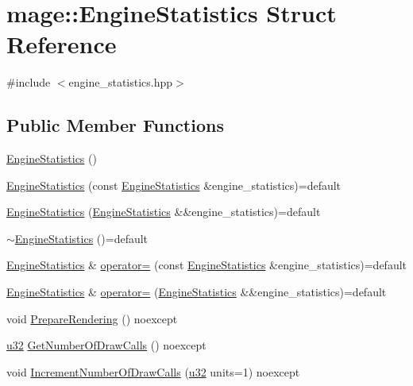 \hypertarget{structmage_1_1_engine_statistics}{}\section{mage\+:\+:Engine\+Statistics Struct Reference}
\label{structmage_1_1_engine_statistics}


{\ttfamily \#include $<$engine\+\_\+statistics.\+hpp$>$}

\subsection*{Public Member Functions}
\begin{DoxyCompactItemize}
\item 
\hyperlink{structmage_1_1_engine_statistics_acbaa39e0e0ee0d6cb5c8d174bb80a3fd}{Engine\+Statistics} ()
\item 
\hyperlink{structmage_1_1_engine_statistics_a8361fa991298c7669b4e3c8262acff60}{Engine\+Statistics} (const \hyperlink{structmage_1_1_engine_statistics}{Engine\+Statistics} \&engine\+\_\+statistics)=default
\item 
\hyperlink{structmage_1_1_engine_statistics_acb3eb7a8f16733d29b4a0e4490723cd5}{Engine\+Statistics} (\hyperlink{structmage_1_1_engine_statistics}{Engine\+Statistics} \&\&engine\+\_\+statistics)=default
\item 
\hyperlink{structmage_1_1_engine_statistics_a471f643061b881ae69cc807b34c48127}{$\sim$\+Engine\+Statistics} ()=default
\item 
\hyperlink{structmage_1_1_engine_statistics}{Engine\+Statistics} \& \hyperlink{structmage_1_1_engine_statistics_a6c5e8b9a5806e67f6f93a3c558293249}{operator=} (const \hyperlink{structmage_1_1_engine_statistics}{Engine\+Statistics} \&engine\+\_\+statistics)=default
\item 
\hyperlink{structmage_1_1_engine_statistics}{Engine\+Statistics} \& \hyperlink{structmage_1_1_engine_statistics_a4674d3856fee372e05f1bed017e46d5b}{operator=} (\hyperlink{structmage_1_1_engine_statistics}{Engine\+Statistics} \&\&engine\+\_\+statistics)=default
\item 
void \hyperlink{structmage_1_1_engine_statistics_a722912aa5e93caff589a52bb10be930d}{Prepare\+Rendering} () noexcept
\item 
\hyperlink{namespacemage_af2b398bf98eb10351f49cad73fe2cc73}{u32} \hyperlink{structmage_1_1_engine_statistics_a30f7569158e4983eb98bb60c392b43fe}{Get\+Number\+Of\+Draw\+Calls} () noexcept
\item 
void \hyperlink{structmage_1_1_engine_statistics_a26e45d8996cc018f3632f3c2c0fcff7c}{Increment\+Number\+Of\+Draw\+Calls} (\hyperlink{namespacemage_af2b398bf98eb10351f49cad73fe2cc73}{u32} units=1) noexcept
\end{DoxyCompactItemize}
